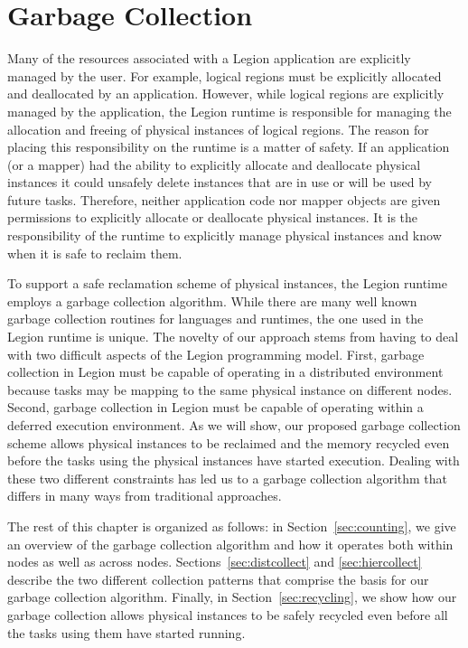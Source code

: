 

\chapter{Garbage Collection}
\label{chapter:garbage}
Many of the resources associated with a Legion application
are explicitly managed by the user.  For example, logical 
regions must be explicitly allocated and deallocated
by an application. However, while logical regions are 
explicitly managed by the application, the Legion runtime
is responsible for managing the allocation and freeing of
physical instances of logical regions. The reason for 
placing this responsibility on the runtime is a matter of
safety. If an application (or a mapper) had the ability
to explicitly allocate and deallocate physical instances
it could unsafely delete instances that are in use
or will be used by future tasks. Therefore, neither 
application code nor mapper objects are given permissions
to explicitly allocate or deallocate physical instances.
It is the responsibility of the runtime to explicitly 
manage physical instances and know when it is safe to 
reclaim them.

To support a safe reclamation scheme of physical instances,
the Legion runtime employs a garbage collection algorithm.
While there are many well known garbage collection 
routines for languages and runtimes, the one used
in the Legion runtime is unique. The novelty of our
approach stems from having to deal with two difficult
aspects of the Legion programming model.  First, garbage
collection in Legion must be capable of operating in 
a distributed environment because tasks may be mapping
to the same physical instance on different nodes.
Second, garbage collection in Legion must be capable
of operating within a deferred execution environment.
As we will show, our proposed garbage collection scheme
allows physical instances to be reclaimed and the
memory recycled even before the tasks using the
physical instances have started execution. Dealing with
these two different constraints has led us to a
garbage collection algorithm that differs in many
ways from traditional approaches.

The rest of this chapter is organized as follows:
in Section~\ref{sec:counting}, we give an overview
of the garbage collection algorithm and how it 
operates both within nodes as well as across nodes.
Sections~\ref{sec:distcollect} and \ref{sec:hiercollect}
describe the two different collection patterns that
comprise the basis for our garbage collection 
algorithm. Finally, in Section~\ref{sec:recycling},
we show how our garbage collection allows physical
instances to be safely recycled even before all the 
tasks using them have started running.


